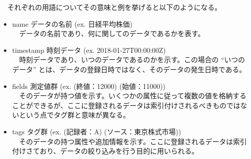 \documentclass[dvipdfmx]{scrartcl}
\begin{document}
　それぞれの用語についてその意味と例を挙げると以下のようになる。\\
\begin{itemize}
\item name データの名前 (ex. 日経平均株価)\\
　データの名前であり、何に関してのデータであるかを表す。\\
\item timestamp 時刻データ (ex. 2018-01-27T00:00:00Z)\\
　時刻データであり、いつのデータであるのかを示す。この場合の ``いつのデータ'' とは、データの登録日時ではなく、そのデータの発生日時である。\\
\item fields 測定値群 (ex. (終値：12000) (始値：11000))\\
　そのデータが持つ値を示す。いくつかの属性に従って複数の値を格納することができるが、ここに登録されるデータは索引付けされるべきものではないという点でタグ群と意味が異なる。\\
\item tags タグ群 (ex. (記録者：A) (ソース：東京株式市場))\\
　そのデータの持つ属性や追加情報を示す。ここに登録されるデータは索引付けさており、データの絞り込みを行う目的に用いられる。\\
\end{itemize}
\end{document}
